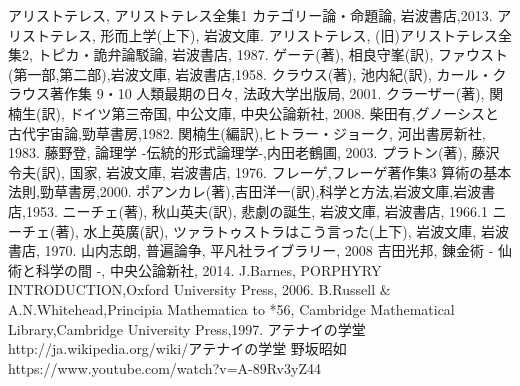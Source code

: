 \documentclass[b5j,8pt,twocolumn]{ltjsarticle}
\begin{document}
\begin{thebibliography}{99}
アリストテレス, アリストテレス全集1 カテゴリー論・命題論, 岩波書店,2013.
アリストテレス, 形而上学(上下), 岩波文庫.
アリストテレス, (旧)アリストテレス全集2, トピカ・詭弁論駁論, 岩波書店, 1987.
ゲーテ(著), 相良守峯(訳), ファウスト(第一部,第二部),岩波文庫, 岩波書店,1958.
クラウス(著), 池内紀(訳), 
カール・クラウス著作集 9・10 人類最期の日々, 法政大学出版局, 2001.
クラーザー(著), 関楠生(訳), ドイツ第三帝国, 中公文庫, 中央公論新社, 2008.
柴田有,グノーシスと古代宇宙論,勁草書房,1982.
関楠生(編訳),ヒトラー・ジョーク, 河出書房新社, 1983.
藤野登, 論理学 -伝統的形式論理学-,内田老鶴圃, 2003.
プラトン(著), 藤沢 令夫(訳), 国家, 岩波文庫, 岩波書店, 1976.
フレーゲ,フレーゲ著作集3 算術の基本法則,勁草書房,2000.
ポアンカレ(著),吉田洋一(訳),科学と方法,岩波文庫,岩波書店,1953. 
ニーチェ(著), 秋山英夫(訳), 悲劇の誕生, 岩波文庫, 岩波書店, 1966.1
ニーチェ(著), 水上英廣(訳), ツァラトゥストラはこう言った(上下), 
岩波文庫, 岩波書店, 1970.
山内志朗, 普遍論争, 平凡社ライブラリー, 2008
吉田光邦, 錬金術 - 仙術と科学の間 -, 中央公論新社, 2014.
J.Barnes, PORPHYRY INTRODUCTION,Oxford University Press, 2006.
B.Russell \& A.N.Whitehead,Principia Mathematica to *56,
Cambridge Mathematical Library,Cambridge University Press,1997.
アテナイの学堂 
http://ja.wikipedia.org/wiki/アテナイの学堂
野坂昭如
https://www.youtube.com/watch?v=A-89Rv3yZ44
\end{thebibliography}
\end{document}
